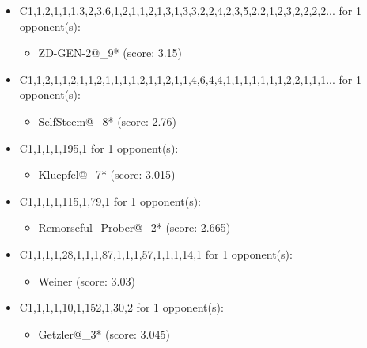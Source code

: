 \begin{appendices}
\begin{itemize}
    \item C1,1,2,1,1,1,3,2,3,6,1,2,1,1,2,1,3,1,3,3,2,2,4,2,3,5,2,2,1,2,3,2,2,2,2... for 1 opponent(s):
    \begin{multicols}{3}
         \begin{itemize}
            \item ZD-GEN-2@\_9* (score: 3.15)
        \end{itemize}
     \end{multicols}
     
    \item C1,1,2,1,1,2,1,1,2,1,1,1,1,2,1,1,2,1,1,4,6,4,4,1,1,1,1,1,1,1,2,2,1,1,1... for 1 opponent(s):
    \begin{multicols}{3}
         \begin{itemize}
            \item SelfSteem@\_8* (score: 2.76)
        \end{itemize}
     \end{multicols}
     
    \item C1,1,1,1,195,1 for 1 opponent(s):
    \begin{multicols}{3}
         \begin{itemize}
            \item Kluepfel@\_7* (score: 3.015)
        \end{itemize}
     \end{multicols}
     
    \item C1,1,1,1,115,1,79,1 for 1 opponent(s):
    \begin{multicols}{3}
         \begin{itemize}
            \item Remorseful\_Prober@\_2* (score: 2.665)
        \end{itemize}
     \end{multicols}
     
    \item C1,1,1,1,28,1,1,1,87,1,1,1,57,1,1,1,14,1 for 1 opponent(s):
    \begin{multicols}{3}
         \begin{itemize}
            \item Weiner (score: 3.03)
        \end{itemize}
     \end{multicols}
     
    \item C1,1,1,1,10,1,152,1,30,2 for 1 opponent(s):
    \begin{multicols}{3}
         \begin{itemize}
            \item Getzler@\_3* (score: 3.045)
        \end{itemize}
     \end{multicols}
     

\end{itemize}
\end{appendices}
